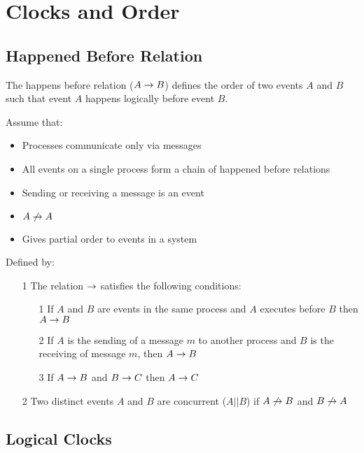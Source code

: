 \documentclass[a4paper]{article}
\begin{document}
\section{Clocks and Order}
\label{sec:clocks_and_order}

\subsection{Happened Before Relation}

The happens before relation ($A \rightarrow B$) defines the order of two events
$A$ and $B$ such that event $A$ happens logically before event $B$.

Assume that:

\begin{itemize}
  \item Processes communicate only via messages
  \item All events on a single process form a chain of happened before relations
  \item Sending or receiving a message is an event
  \item $A \not\rightarrow A$
  \item Gives partial order to events in a system
\end{itemize}

Defined by:

\begin{enumerate}
  \item[1] The relation $\rightarrow$ satisfies the following conditions:
    \begin{enumerate}
      \item[1] If $A$ and $B$ are events in the same process and $A$ executes
               before $B$ then $A \rightarrow B$
      \item[2] If $A$ is the sending of a message $m$ to another process and $B$
               is the receiving of message $m$, then $A \rightarrow B$
      \item[3] If $A \rightarrow B$ and $B \rightarrow C$ then $A
               \rightarrow C$
    \end{enumerate}

  \item[2] Two distinct events $A$ and $B$ are concurrent ($A || B$) if $A
           \not\rightarrow B$ and $B \not\rightarrow A$

\end{enumerate}

\subsection{Logical Clocks}
\end{document}
